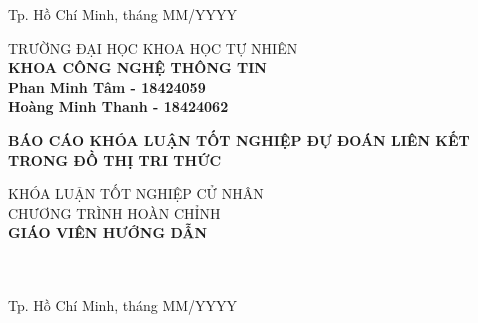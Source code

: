 \begin{titlepage}
\begin{center}
\vfill
Tp. Hồ Chí Minh, tháng MM/YYYY

\end{center}

\pagebreak



\begin{center}

TRƯỜNG ĐẠI HỌC KHOA HỌC TỰ NHIÊN\\
\textbf{KHOA CÔNG NGHỆ THÔNG TIN}\\[2cm]


{\large \bfseries Phan Minh Tâm - 18424059\\} 
{\large \bfseries Hoàng Minh Thanh - 18424062\\[2cm]}


{ \Large \bfseries  BÁO CÁO KHÓA LUẬN TỐT NGHIỆP ĐỰ ĐOÁN LIÊN KẾT TRONG ĐỒ THỊ TRI THỨC\\[2cm] } 


\large KHÓA LUẬN TỐT NGHIỆP CỬ NHÂN\\
\large CHƯƠNG TRÌNH HOÀN CHỈNH\\[2cm]

\textbf{GIÁO VIÊN HƯỚNG DẪN}\\
\tenGVHD\\
\tenBM\\


\vfill
Tp. Hồ Chí Minh, tháng MM/YYYY

\end{center}

\end{titlepage}